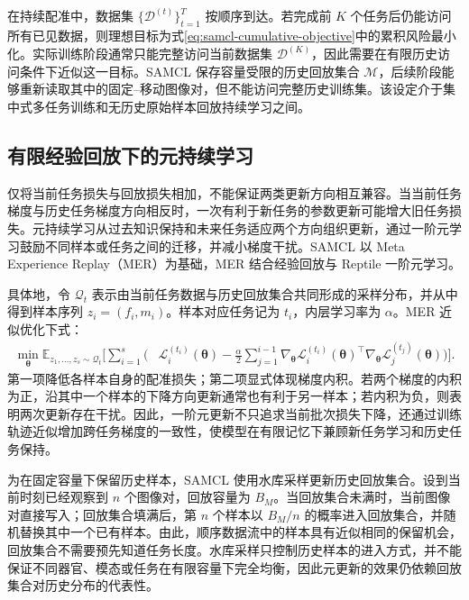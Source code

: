 在持续配准中，数据集
$\{\mathcal{D}^{(t)}\}_{t=1}^{T}$ 按顺序到达。若完成前 $K$ 个任务后仍能访问所有已见数据，则理想目标为式\eqref{eq:samcl-cumulative-objective}中的累积风险最小化。实际训练阶段通常只能完整访问当前数据集 $\mathcal{D}^{(K)}$，因此需要在有限历史访问条件下近似这一目标。SAMCL 保存容量受限的历史回放集合 $\mathcal{M}$，后续阶段能够重新读取其中的固定--移动图像对，但不能访问完整历史训练集。该设定介于集中式多任务训练和无历史原始样本回放持续学习之间。

\subsection{有限经验回放下的元持续学习}
\label{subsec:samcl-meta-continual}

仅将当前任务损失与回放损失相加，不能保证两类更新方向相互兼容。当当前任务梯度与历史任务梯度方向相反时，一次有利于新任务的参数更新可能增大旧任务损失。元持续学习从过去知识保持和未来任务适应两个方向组织更新，通过一阶元学习鼓励不同样本或任务之间的迁移，并减小梯度干扰。SAMCL 以 Meta Experience Replay（MER）为基础，MER 结合经验回放与 Reptile 一阶元学习\cite{riemer2019mer,nichol2018firstorder,method_replay_er}。

具体地，令 $\mathcal{Q}_t$ 表示由当前任务数据与历史回放集合共同形成的采样分布，并从中得到样本序列
$z_i=(f_i,m_i)$。样本对应任务记为 $t_i$，内层学习率为 $\alpha$。MER 近似优化下式：
\begin{equation}
\begin{aligned}
\min_{\boldsymbol{\theta}}
\mathbb{E}_{z_1,\ldots,z_s\sim\mathcal{Q}_t}
\Bigg[
\sum_{i=1}^{s}
\Bigg(&
\mathcal{L}^{(t_i)}_i(\boldsymbol{\theta})
-
\frac{\alpha}{2}
\sum_{j=1}^{i-1}
\nabla_{\boldsymbol{\theta}}
\mathcal{L}^{(t_i)}_i(\boldsymbol{\theta})^{\top}
\nabla_{\boldsymbol{\theta}}
\mathcal{L}^{(t_j)}_j(\boldsymbol{\theta})
\Bigg)
\Bigg].
\end{aligned}
\label{eq:samcl-meta-objective}
\end{equation}
第一项降低各样本自身的配准损失；第二项显式体现梯度内积。若两个梯度的内积为正，沿其中一个样本的下降方向更新通常也有利于另一样本；若内积为负，则表明两次更新存在干扰。因此，一阶元更新不只追求当前批次损失下降，还通过训练轨迹近似增加跨任务梯度的一致性，使模型在有限记忆下兼顾新任务学习和历史任务保持。

为在固定容量下保留历史样本，SAMCL 使用水库采样更新历史回放集合。设到当前时刻已经观察到 $n$ 个图像对，回放容量为 $B_M$。当回放集合未满时，当前图像对直接写入；回放集合填满后，第 $n$ 个样本以 $B_M/n$ 的概率进入回放集合，并随机替换其中一个已有样本。由此，顺序数据流中的样本具有近似相同的保留机会，回放集合不需要预先知道任务长度。水库采样只控制历史样本的进入方式，并不能保证不同器官、模态或任务在有限容量下完全均衡，因此元更新的效果仍依赖回放集合对历史分布的代表性。

